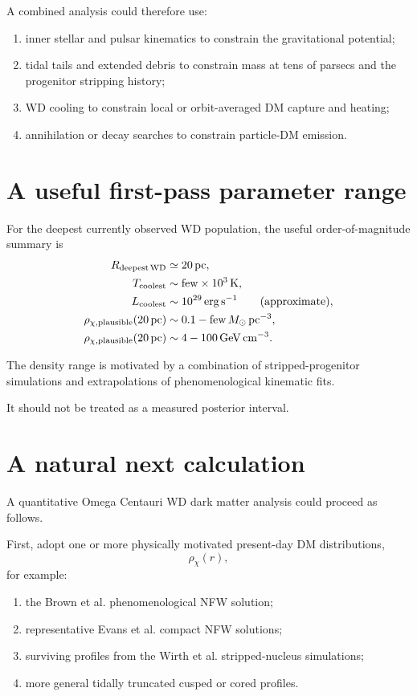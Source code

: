 \documentclass[11pt,a4paper]{article}
\begin{document}
A combined analysis could therefore use:
\begin{enumerate}[label=(\roman*)]
\item inner stellar and pulsar kinematics to constrain the gravitational potential;
\item tidal tails and extended debris to constrain mass at tens of parsecs and the progenitor stripping history;
\item WD cooling to constrain local or orbit-averaged DM capture and heating;
\item annihilation or decay searches to constrain particle-DM emission.
\end{enumerate}


\section{A useful first-pass parameter range}

For the deepest currently observed WD population, the useful order-of-magnitude summary is
\begin{align}
R_{\rm deepest\,WD}
&\simeq20\,{\rm pc},
\\
T_{\rm coolest}
&\sim \mathrm{few}\times10^3\,{\rm K},
\\
L_{\rm coolest}
&\sim10^{29}\,{\rm erg\,s^{-1}}
\qquad\text{(approximate)},
\\
\rho_{\chi,\rm plausible}(20\,{\rm pc})
&\sim0.1-\mathrm{few}\,
M_\odot\,{\rm pc}^{-3},
\\
\rho_{\chi,\rm plausible}(20\,{\rm pc})
&\sim4-100\,
{\rm GeV\,cm^{-3}}.
\end{align}

The density range is motivated by a combination of stripped-progenitor simulations and extrapolations of phenomenological kinematic fits.

It should not be treated as a measured posterior interval.


\section{A natural next calculation}

A quantitative Omega Centauri WD dark matter analysis could proceed as follows.

First, adopt one or more physically motivated present-day DM distributions,
\begin{equation}
\rho_\chi(r),
\end{equation}
for example:
\begin{enumerate}[label=(\roman*)]
\item the Brown et al. phenomenological NFW solution;
\item representative Evans et al. compact NFW solutions;
\item surviving profiles from the Wirth et al. stripped-nucleus simulations;
\item more general tidally truncated cusped or cored profiles.
\end{enumerate}
\end{document}

